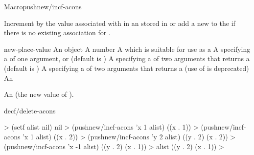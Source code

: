 \documentclass[10pt,twoside,english,pdftex]{article}
\begin{document}
\begin{functiondoc}{Macro}{pushnew/incf-acons}{%
    }
%
%
%
%
  
\fnsyntax

\fnpurpose Increment by  the value associated with
 in an  stored in  or add a
new   to the
 if there is no existing association for .

\fnpackage {}

\fnmodule {}

\fnargs
\begin{args}{new-place-value}
\arg[item] An object
\arg[increment] A number
\arg[place] A  which is suitable for use as a
\arg[key] A  specifying a 
of one argument, or \nil{} (default is \nil)
\arg[test] A  specifying a 
of two arguments that returns a  (default is
)
 A  specifying a
 of two arguments that returns a
 (use of  is deprecated)
 An 
\end{args}

\fnreturns An  (the new value of ). 

\begin{alsos}{decf/delete-acons}
\end{alsos}

\fnexamples
%
\W\supp
\begin{example}
  > (setf alist nil)
  nil
  > (pushnew/incf-acons 'x 1 alist)
  ((x . 1))
  > (pushnew/incf-acons 'x 1 alist)
  ((x . 2))\goodpagebreak
  > (pushnew/incf-acons 'y 2 alist)
  ((y . 2) (x . 2))
  > (pushnew/incf-acons 'x -1 alist)
  ((y . 2) (x . 1))
  > alist
  ((y . 2) (x . 1))
  >
\end{example}


\end{functiondoc}
\end{document}
